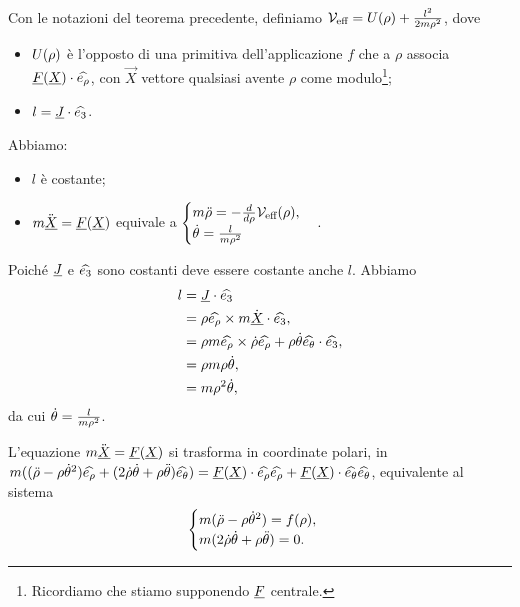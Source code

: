 \begin{Theorem}
	Con le notazioni del teorema precedente, definiamo $\mathcal{V}_{\text{eff}} = U(\rho) + \frac{l^2}{2 m \rho^2}$, dove
	\begin{itemize}
		\item $U(\rho)$ \`e l'opposto di una primitiva dell'applicazione $f$ che a $\rho$ associa $\underline{F}(\underline{X}) \cdot \widehat{e_\rho}$, con $\vec{X}$ vettore qualsiasi avente $\rho$ come modulo\footnote{Ricordiamo che stiamo supponendo $\underline{F}$ centrale.};
		\item $l = \underline{J} \cdot \widehat{e_3}$.
	\end{itemize}
	Abbiamo:
	\begin{itemize}
		\item $l$ \`e costante;
		\item $m \ddot{\underline{X}} = \underline{F}(\underline{X})$ equivale a $\begin{cases}m \ddot{\rho} = - \frac{d }{d \rho} \mathcal{V}_{\text{eff}}(\rho),\\\dot{\theta} = \frac{l}{m \rho^2}\end{cases}.$
	\end{itemize}
\end{Theorem}
\Proof Poich\'e $\underline{J}$ e ${\widehat{e_3}}$ sono costanti deve essere costante anche $l$. Abbiamo
\begin{align*}
l &= \underline{J} \cdot \widehat{e_3}\\
&= \rho\widehat{e_\rho} \times m \dot{\underline{X}} \cdot \widehat{e_3},\\
&= \rho m \widehat{e_\rho} \times \dot{\rho}\widehat{e_\rho} + \rho \dot{\theta}\widehat{e_\theta} \cdot \widehat{e_3},\\
&= \rho m \rho \dot{\theta},\\
&= m \rho^2 \dot{\theta},
\end{align*}
da cui $\dot{\theta} = \frac{l}{m \rho^2}$.
\par L'equazione $\Mass \ddot{\vec{X}} = \VectorField(\Vec{X})$ si trasforma in coordinate polari, in $m ((\ddot{\rho} - \rho \dot{\theta}^2)\widehat{e_\rho} + (2\dot{\rho}\dot{\theta} + \rho\ddot{\theta})\widehat{e_\theta}) = \underline{F}(\underline{X}) \cdot \widehat{e_\rho} \widehat{e_\rho} + \underline{F}(\underline{X}) \cdot \widehat{e_\theta} \widehat{e_\theta}$, equivalente al sistema
\[
\begin{cases}
m(\ddot{\rho} - \rho \dot{\theta}^2) = f(\rho),\\
m(2 \dot{\rho}\dot{\theta} + \rho\ddot{\theta}) = 0.
\end{cases}
\]
